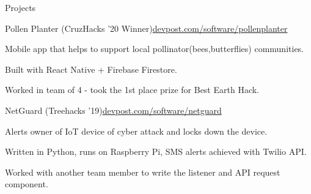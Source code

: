 \documentclass{resume} %
\begin{document}

\begin{rSection}{Projects}

    \begin{rSubsection}{Pollen Planter (CruzHacks '20 Winner)}{\href{https://www.devpost.com/software/pollenplanter}{devpost.com/software/pollenplanter}}{}{}
        \item Mobile app that helps to support local pollinator(bees,butterflies) communities.
        \item Built with React Native + Firebase Firestore.
        \item Worked in team of 4 - took the 1st place prize for Best Earth Hack.
    \end{rSubsection}

    \begin{rSubsection}{NetGuard (Treehacks '19)}{\href{https://www.devpost.com/software/netguard}{devpost.com/software/netguard}}{}{}
        \item Alerts owner of IoT device of cyber attack and locks down the device.
        \item Written in Python, runs on Raspberry Pi, SMS alerts achieved with Twilio API.
        \item Worked with another team member to write the listener and API request component.
    \end{rSubsection}

\end{rSection}





\end{document}
